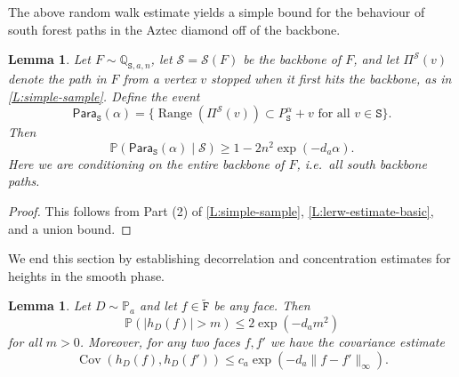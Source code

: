 \documentclass[11pt,twoside]{amsart}
\theoremstyle{plain}
\newtheorem{lem}[thm]{Lemma}
\numberwithin{quest}{section}
\theoremstyle{remark}
\numberwithin{rem}{section}
\theoremstyle{definition}
\newcommand{\Q}{\mathbb{Q}}
\renewcommand{\P}{\mathbb{P}}
\newcommand{\cS}{\mathcal{S}}
\renewcommand{\tt}[1]{{\mathtt{#1}}}
\begin{document}
	The above random walk estimate yields a simple bound for the behaviour of south forest paths in the Aztec diamond off of the backbone. 
	
	\begin{lem}
		\label{L:regular-paths}
		Let $F \sim \Q_{\tt{S}, a, n}$, let $\cS = \cS(F)$ be the backbone of $F$, and let $\Pi^\cS(v)$ denote the path in $F$ from a vertex $v$ stopped when it first hits the backbone, as in \cref{L:simple-sample}. Define the event
		$$
		\mathsf{Para}_\tt{S}(\alpha) = \{\operatorname{Range}(\Pi^\cS(v)) \subset P^\alpha_\tt{S} + v \text{ for all } v \in \tt{S}\}.
		$$
		Then
		$$
		\P(\mathsf{Para}_\tt{S}(\alpha) \mid \cS) \ge 1 - 2 n^2 \exp(-d_a \alpha).
		$$
        Here we are conditioning on the entire backbone of $F$, i.e.\ all south backbone paths.
	\end{lem}
	
	\begin{proof}
		This follows from Part (2) of \cref{L:simple-sample}, \cref{L:lerw-estimate-basic}, and a union bound. 	
	\end{proof} 
	
	We end this section by establishing decorrelation and concentration estimates for heights in the smooth phase.
	
	\begin{lem}
		\label{L:smooth-phase-heights-decor}
		Let $D \sim \P_a$ and let $f \in \tt{\tilde F}$ be any face. Then
		\begin{equation}
			\label{E:height-subgauss}
			\P(|h_D(f)| > m) \le 2\exp(-d_a m^2)
		\end{equation}
		for all $m > 0$. 
		Moreover, for any two faces $f, f'$ we have the covariance estimate
		$$
		\operatorname{Cov}(h_D(f), h_D(f')) \le c_a \exp(-d_a\|f - f'\|_\infty).
		$$
	\end{lem}
	
\end{document}
